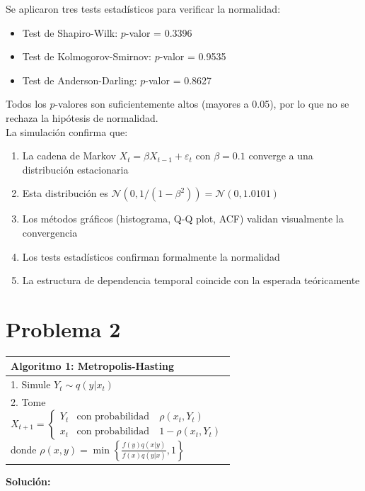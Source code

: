 \documentclass[12pt,a4paper]{article}
\begin{document}
Se aplicaron tres tests estadísticos para verificar la normalidad:
\begin{itemize}
    \item Test de Shapiro-Wilk: $p$-valor = 0.3396
    \item Test de Kolmogorov-Smirnov: $p$-valor = 0.9535
    \item Test de Anderson-Darling: $p$-valor = 0.8627
\end{itemize}

Todos los $p$-valores son suficientemente altos (mayores a 0.05), por lo que no se rechaza la hipótesis de normalidad. \\

La simulación confirma que:
\begin{enumerate}
    \item La cadena de Markov $X_t = \beta X_{t-1} + \varepsilon_t$ con $\beta = 0.1$ converge a una distribución estacionaria
    \item Esta distribución es $\mathcal{N}(0, 1/(1-\beta^2)) = \mathcal{N}(0, 1.0101)$
    \item Los métodos gráficos (histograma, Q-Q plot, ACF) validan visualmente la convergencia
    \item Los tests estadísticos confirman formalmente la normalidad
    \item La estructura de dependencia temporal coincide con la esperada teóricamente
\end{enumerate}

\section*{Problema 2}

\begin{center}
\end{center}

\begin{center}
\begin{tabular}{|p{\textwidth}|}
\hline
\textbf{Algoritmo 1:} Metropolis-Hasting \\
\hline
1. Simule $Y_t \sim q(y|x_t)$ \\[0.5em]
2. Tome 
\begin{equation*}
X_{t+1} = \begin{cases}
Y_t & \text{con probabilidad} \quad \rho(x_t, Y_t) \\
x_t & \text{con probabilidad} \quad 1 - \rho(x_t, Y_t)
\end{cases}
\end{equation*}
donde $\rho(x, y) = \min\left\{\frac{f(y)q(x|y)}{f(x)q(y|x)}, 1\right\}$ \\
\hline
\end{tabular}
\end{center}

\textbf{Solución:}
\end{document}
